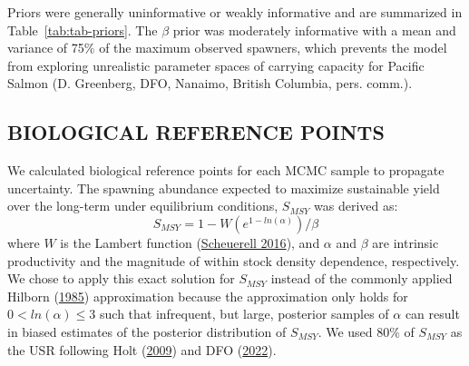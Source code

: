 \documentclass[french,11pt]{book}
\begin{document}
Priors were generally uninformative or weakly informative and are summarized in Table~\ref{tab:tab-priors}. The \(\beta\) prior was moderately informative with a mean and variance of 75\% of the maximum observed spawners, which prevents the model from exploring unrealistic parameter spaces of carrying capacity for Pacific Salmon (D. Greenberg, DFO, Nanaimo, British Columbia, pers. comm.).

\hypertarget{biological-reference-points}{%
\subsection{BIOLOGICAL REFERENCE POINTS}\label{biological-reference-points}}

We calculated biological reference points for each MCMC sample to propagate uncertainty. The spawning abundance expected to maximize sustainable yield over the long-term under equilibrium conditions, \(S_{MSY}\) was derived as:
\begin{equation}
S_{MSY} = 1 - W(e^{1-ln(\alpha)})/\beta
\label{eq:get-Smsy}
\end{equation}
where \(W\) is the Lambert function (\protect\hyperlink{ref-scheuerellExplicitSolutionCalculating2016}{Scheuerell 2016}), and \(\alpha\) and \(\beta\) are intrinsic productivity and the magnitude of within stock density dependence, respectively. We chose to apply this exact solution for \(S_{MSY}\) instead of the commonly applied Hilborn (\protect\hyperlink{ref-hilborn1985simplified}{1985}) approximation because the approximation only holds for \(0 <ln(\alpha) \leq3\) such that infrequent, but large, posterior samples of \(\alpha\) can result in biased estimates of the posterior distribution of \(S_{MSY}\). We used 80\% of \(S_{MSY}\) as the USR following Holt (\protect\hyperlink{ref-holtEvaluationBenchmarksConservation2009}{2009}) and DFO (\protect\hyperlink{ref-dfoSustainableFisheriesFramework2022}{2022}).
\end{document}
